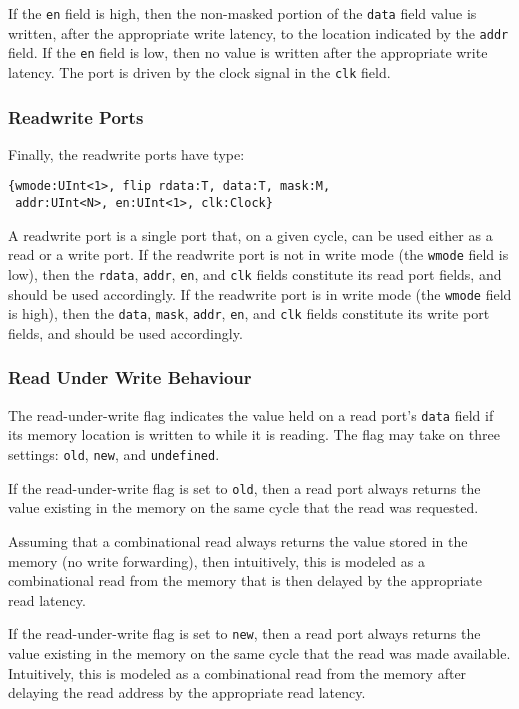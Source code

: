 \documentclass[12pt]{article}
\begin{document}
If the \verb|en| field is high, then the non-masked portion of the \verb|data| field value is written, after the appropriate write latency, to the location indicated by the \verb|addr| field. If the \verb|en| field is low, then no value is written after the appropriate write latency. The port is driven by the clock signal in the \verb|clk| field.

\subsubsection{Readwrite Ports}
Finally, the readwrite ports have type:
\begin{verbatim}
{wmode:UInt<1>, flip rdata:T, data:T, mask:M, 
 addr:UInt<N>, en:UInt<1>, clk:Clock}
\end{verbatim}
A readwrite port is a single port that, on a given cycle, can be used either as a read or a write port. If the readwrite port is not in write mode (the \verb|wmode| field is low), then the \verb|rdata|, \verb|addr|, \verb|en|, and \verb|clk| fields constitute its read port fields, and should be used accordingly. If the readwrite port is in write mode (the \verb|wmode| field is high), then the \verb|data|, \verb|mask|, \verb|addr|, \verb|en|, and \verb|clk| fields constitute its write port fields, and should be used accordingly. 

\subsubsection{Read Under Write Behaviour}

The read-under-write flag indicates the value held on a read port's \verb|data| field if its memory location is written to while it is reading. The flag may take on three settings: \verb|old|, \verb|new|, and \verb|undefined|.

If the read-under-write flag is set to \verb|old|, then a read port always returns the value existing in the memory on the same cycle that the read was requested. 

Assuming that a combinational read always returns the value stored in the memory (no write forwarding), then intuitively, this is modeled as a combinational read from the memory that is then delayed by the appropriate read latency.

If the read-under-write flag is set to \verb|new|, then a read port always returns the value existing in the memory on the same cycle that the read was made available. Intuitively, this is modeled as a combinational read from the memory after delaying the read address by the appropriate read latency.
\end{document}
